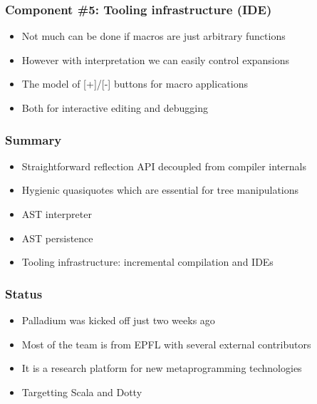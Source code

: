 \documentclass[svgnames,dvipsnames,hyperref={bookmarks=false}]{beamer}
\begin{document}
\begin{frame}[fragile]
\frametitle{Component \#5: Tooling infrastructure (IDE)}

\begin{itemize}
\item Not much can be done if macros are just arbitrary functions
\item However with interpretation we can easily control expansions
\item The model of [+]/[-] buttons for macro applications
\item Both for interactive editing and debugging
\end{itemize}
\end{frame}

\begin{frame}[fragile]
\frametitle{Summary}

\begin{itemize}
\item Straightforward reflection API decoupled from compiler internals
\item Hygienic quasiquotes which are essential for tree manipulations
\item AST interpreter
\item AST persistence
\item Tooling infrastructure: incremental compilation and IDEs
\end{itemize}
\end{frame}

\begin{frame}[fragile]
\frametitle{}

\vskip40pt
\begin{center}
\end{center}
\end{frame}

\begin{frame}[fragile]
\frametitle{Status}

\begin{itemize}
\item Palladium was kicked off just two weeks ago
\item Most of the team is from EPFL with several external contributors
\item It is a research platform for new metaprogramming technologies
\item Targetting Scala and Dotty
\end{itemize}
\end{frame}
\end{document}
